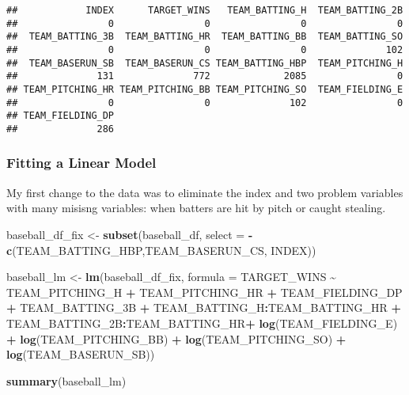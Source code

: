 \documentclass[
]{article}
\newenvironment{Shaded}{\begin{snugshade}}{\end{snugshade}}
\newcommand{\DataTypeTok}[1]{\textcolor[rgb]{0.13,0.29,0.53}{#1}}
\newcommand{\KeywordTok}[1]{\textcolor[rgb]{0.13,0.29,0.53}{\textbf{#1}}}
\newcommand{\NormalTok}[1]{#1}
\newcommand{\OperatorTok}[1]{\textcolor[rgb]{0.81,0.36,0.00}{\textbf{#1}}}
\newcommand{\StringTok}[1]{\textcolor[rgb]{0.31,0.60,0.02}{#1}}
\begin{document}
\begin{verbatim}
##            INDEX      TARGET_WINS   TEAM_BATTING_H  TEAM_BATTING_2B 
##                0                0                0                0 
##  TEAM_BATTING_3B  TEAM_BATTING_HR  TEAM_BATTING_BB  TEAM_BATTING_SO 
##                0                0                0              102 
##  TEAM_BASERUN_SB  TEAM_BASERUN_CS TEAM_BATTING_HBP  TEAM_PITCHING_H 
##              131              772             2085                0 
## TEAM_PITCHING_HR TEAM_PITCHING_BB TEAM_PITCHING_SO  TEAM_FIELDING_E 
##                0                0              102                0 
## TEAM_FIELDING_DP 
##              286
\end{verbatim}

\hypertarget{fitting-a-linear-model}{%
\subsubsection{Fitting a Linear Model}\label{fitting-a-linear-model}}

My first change to the data was to eliminate the index and two problem
variables with many misisng variables: when batters are hit by pitch or
caught stealing.

\begin{Shaded}
\begin{Highlighting}[]
\NormalTok{baseball\_df\_fix \textless{}{-}}\StringTok{ }\KeywordTok{subset}\NormalTok{(baseball\_df, }\DataTypeTok{select =} \OperatorTok{{-}}\KeywordTok{c}\NormalTok{(TEAM\_BATTING\_HBP,TEAM\_BASERUN\_CS, INDEX))}

\NormalTok{baseball\_lm \textless{}{-}}\StringTok{ }\KeywordTok{lm}\NormalTok{(baseball\_df\_fix, }\DataTypeTok{formula =}\NormalTok{ TARGET\_WINS }\OperatorTok{\textasciitilde{}}\StringTok{  }\NormalTok{TEAM\_PITCHING\_H }\OperatorTok{+}\StringTok{ }\NormalTok{TEAM\_PITCHING\_HR }\OperatorTok{+}\StringTok{ }\NormalTok{TEAM\_FIELDING\_DP }\OperatorTok{+}\StringTok{ }\NormalTok{TEAM\_BATTING\_3B }\OperatorTok{+}\StringTok{ }\NormalTok{TEAM\_BATTING\_H}\OperatorTok{:}\NormalTok{TEAM\_BATTING\_HR }\OperatorTok{+}\StringTok{ }\NormalTok{TEAM\_BATTING\_2B}\OperatorTok{:}\NormalTok{TEAM\_BATTING\_HR}\OperatorTok{+}\StringTok{ }\KeywordTok{log}\NormalTok{(TEAM\_FIELDING\_E) }\OperatorTok{+}\StringTok{ }\KeywordTok{log}\NormalTok{(TEAM\_PITCHING\_BB) }\OperatorTok{+}\StringTok{ }\KeywordTok{log}\NormalTok{(TEAM\_PITCHING\_SO) }\OperatorTok{+}\StringTok{ }\KeywordTok{log}\NormalTok{(TEAM\_BASERUN\_SB))}

\KeywordTok{summary}\NormalTok{(baseball\_lm)}
\end{Highlighting}
\end{Shaded}
\end{document}
